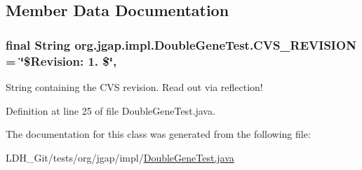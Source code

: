 \subsection{Member Data Documentation}
\hypertarget{classorg_1_1jgap_1_1impl_1_1_double_gene_test_a38d815c0ef3f483eb687883b09a30c41}{
\subsubsection[{C\-V\-S\-\_\-\-R\-E\-V\-I\-S\-I\-O\-N}]{\setlength{\rightskip}{0pt plus 5cm}final String org.\-jgap.\-impl.\-Double\-Gene\-Test.\-C\-V\-S\-\_\-\-R\-E\-V\-I\-S\-I\-O\-N = \char`\"{}\$Revision\-: 1. \$\char`\"{}\hspace{0.3cm}{\ttfamily [static]}, {\ttfamily [private]}}}\label{classorg_1_1jgap_1_1impl_1_1_double_gene_test_a38d815c0ef3f483eb687883b09a30c41}
String containing the C\-V\-S revision. Read out via reflection! 

Definition at line 25 of file Double\-Gene\-Test.\-java.



The documentation for this class was generated from the following file\-:\begin{DoxyCompactItemize}
\item 
L\-D\-H\-\_\-\-Git/tests/org/jgap/impl/\hyperlink{_double_gene_test_8java}{Double\-Gene\-Test.\-java}\end{DoxyCompactItemize}
